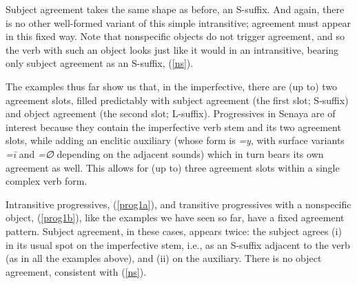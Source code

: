 \documentclass[output=paper
,modfonts
,nonflat]{langsci/langscibook}
\begin{document}
\noindent Subject agreement takes the same shape as before, an S-suffix. And again, there is no other well-formed variant of this simple intransitive; agreement must appear in this fixed way. Note that nonspecific objects do not trigger agreement, and so the verb with such an object looks just like it would in an intransitive, bearing only subject agreement as an S-suffix, (\ref{ns}).

\eal \label{ns}
\zl
The examples thus far show us that, in the imperfective, there are (up to) two agreement slots, filled predictably with subject agreement (the first slot; S-suffix) and object agreement (the second slot; L-suffix). Progressives in Senaya are of interest because they contain the imperfective verb stem and its two agreement slots, while adding an enclitic auxiliary (whose form is \textit{=y}, with surface variants \textit{=\=i} and \textit{=∅} depending on the adjacent sounds) which in turn bears its own agreement as well. This allows for (up to) three agreement slots within a single complex verb form.

Intransitive progressives, (\ref{prog1a}), and transitive progressives with a nonspecific object, (\ref{prog1b}), like the examples we have seen so far, have a fixed agreement pattern. Subject agreement, in these cases, appears twice: the subject agrees (i) in its usual spot on the imperfective stem, i.e., as an S-suffix adjacent to the verb (as in all the examples above), and (ii) on the auxiliary. There is no object agreement, consistent with (\ref{ns}).

\eal \label{prog1}
\zl
\end{document}
